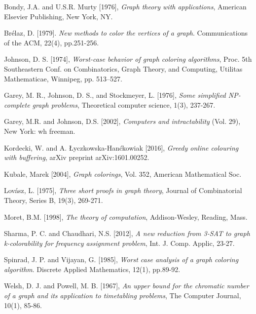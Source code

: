 \documentclass{article}
\theoremstyle{definition}
\begin{document}
\begin{thebibliography}{9}
Bondy, J.A. and U.S.R. Murty [1976],
\emph{Graph theory with applications},
American Elsevier Publishing, New York, NY.

Brélaz, D. [1979]. \emph{New methods to color the vertices of a graph}. Communications of the ACM, 22(4), pp.251-256.

Johnson, D. S. [1974], \emph{Worst-case behavior of graph coloring algorithms}, Proc. 5th Southeastern Conf. on Combinatorics, Graph Theory, and Computing, Utilitas Mathematicae, Winnipeg, pp. 513–527.

Garey, M. R., Johnson, D. S., and Stockmeyer, L. [1976], \emph{Some simplified NP-complete graph problems}, Theoretical computer science, 1(3), 237-267.

Garey, M.R. and Johnson, D.S. [2002], \emph{Computers and intractability} (Vol. 29), New York: wh freeman.

Kordecki, W. and A. Łyczkowska-Hanćkowiak [2016], \emph{Greedy online colouring with buffering}, arXiv preprint arXiv:1601.00252.

Kubale, Marek [2004], \emph{Graph colorings}, Vol. 352, American Mathematical Soc.

Lovász, L. [1975], \emph{Three short proofs in graph theory}, Journal of Combinatorial Theory, Series B, 19(3), 269-271.

Moret, B.M. [1998], \emph{The theory of computation}, Addison-Wesley, Reading, Mass.

Sharma, P. C. and Chaudhari, N.S. [2012], \emph{A new reduction from 3-SAT to graph k-colorability for frequency assignment problem}, Int. J. Comp. Applic, 23-27.

Spinrad, J. P. and Vijayan, G. [1985], \emph{Worst case analysis of a graph coloring algorithm}. Discrete Applied Mathematics, 12(1), pp.89-92.

Welsh, D. J. and Powell, M. B. [1967], \emph{An upper bound for the chromatic number of a graph and its application to timetabling problems}, The Computer Journal, 10(1), 85-86.

\end{thebibliography}
\end{document}
